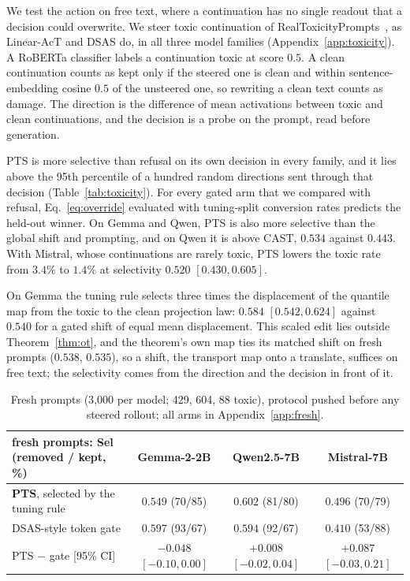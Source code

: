 We test the action on free text, where a continuation has no single readout
that a decision could overwrite. We steer toxic continuation of
RealToxicityPrompts~\citep{gehman2020realtoxicityprompts}, as Linear-AcT and
DSAS do, in all three model families
(Appendix~\ref{app:toxicity}). A RoBERTa classifier labels a continuation toxic
at score $0.5$. A clean continuation counts as kept only if the steered one is
clean and within sentence-embedding cosine $0.5$ of the unsteered one, so
rewriting a clean text counts as damage. The direction is the difference of
mean activations between toxic and clean continuations, and the decision is a
probe on the prompt, read before generation.

PTS is more selective than refusal on its own decision in every family, and it
lies above the 95th percentile of a hundred random directions sent through
that decision (Table~\ref{tab:toxicity}). For every gated arm that we compared
with refusal, Eq.~\eqref{eq:override} evaluated with tuning-split conversion
rates predicts the held-out winner. On Gemma and Qwen, PTS is also
more selective than the global shift and prompting, and on Qwen it is above
CAST, $0.534$ against $0.443$. With Mistral, whose continuations are rarely
toxic, PTS lowers the toxic rate from $3.4\%$ to $1.4\%$ at selectivity $0.520$
$[0.430, 0.605]$.

On Gemma the tuning rule selects three times the displacement of the
quantile map from the toxic to the clean projection law: $0.584$
$[0.542, 0.624]$ against $0.540$ for a gated shift of equal mean displacement.
This scaled edit lies outside Theorem~\ref{thm:ot}, and the theorem's own map
ties its matched shift on fresh prompts ($0.538$, $0.535$), so a shift, the
transport map onto a translate, suffices on free text; the selectivity comes
from the direction and the decision in front of it.

\begin{table}[t]\footnotesize\setlength{\tabcolsep}{4pt}
\centering
\begin{tabular}{l|ccc}
\hline
fresh prompts: Sel (removed / kept, \%) & Gemma-2-2B & Qwen2.5-7B & Mistral-7B \\
\hline
\textbf{PTS}, selected by the tuning rule & $0.549$ (70/85) & $0.602$ (81/80) & $0.496$ (70/79) \\
DSAS-style token gate & $0.597$ (93/67) & $0.594$ (92/67) & $0.410$ (53/88) \\
PTS $-$ gate [95\% CI] & $-0.048$ {\scriptsize$[-0.10, 0.00]$} & $+0.008$ {\scriptsize$[-0.02, 0.04]$} & $+0.087$ {\scriptsize$[-0.03, 0.21]$} \\

\hline
\end{tabular}
\caption{Fresh prompts (3{,}000 per model; 429, 604, 88 toxic), protocol
pushed before any steered rollout; all arms in Appendix~\ref{app:fresh}.}
\label{tab:freshmain}
\end{table}

